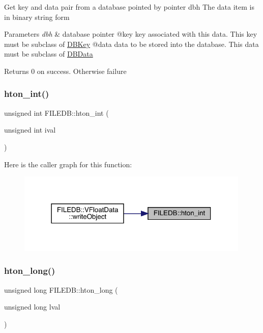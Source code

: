 Get key and data pair from a database pointed by pointer dbh The data item is in binary string form


\begin{DoxyParams}{Parameters}
{\em dbh} & database pointer @key key associated with this data. This key must be subclass of \mbox{\hyperlink{classFILEDB_1_1DBKey}{D\+B\+Key}} @data data to be stored into the database. This data must be subclass of \mbox{\hyperlink{classFILEDB_1_1DBData}{D\+B\+Data}}\\
\hline
\end{DoxyParams}
\begin{DoxyReturn}{Returns}
0 on success. Otherwise failure 
\end{DoxyReturn}
\mbox{\label{namespaceFILEDB_adbce406e3e06947d7312a6d461bc5cc5}} 
\subsubsection{\texorpdfstring{hton\_int()}{hton\_int()}}
{\footnotesize\ttfamily unsigned int F\+I\+L\+E\+D\+B\+::hton\+\_\+int (\begin{DoxyParamCaption}\item[{unsigned int}]{ival }\end{DoxyParamCaption})}

Here is the caller graph for this function\+:
\nopagebreak
\begin{figure}[H]
\begin{center}
\leavevmode
\includegraphics[width=315pt]{d2/de6/namespaceFILEDB_adbce406e3e06947d7312a6d461bc5cc5_icgraph}
\end{center}
\end{figure}
\mbox{\label{namespaceFILEDB_af381773a642a4cc9c68ce682cea411a8}} 
\subsubsection{\texorpdfstring{hton\_long()}{hton\_long()}}
{\footnotesize\ttfamily unsigned long F\+I\+L\+E\+D\+B\+::hton\+\_\+long (\begin{DoxyParamCaption}\item[{unsigned long}]{lval }\end{DoxyParamCaption})}

